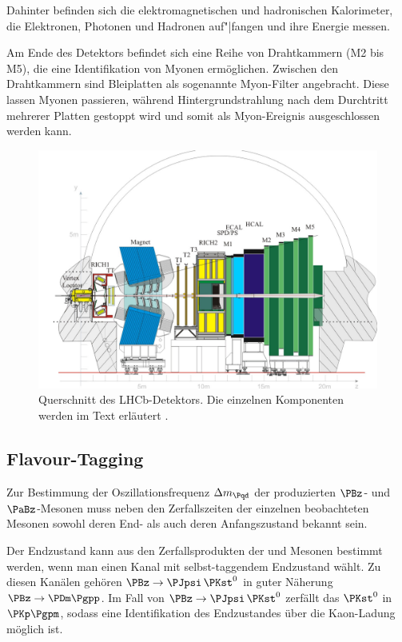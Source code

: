 Dahinter befinden sich die elektromagnetischen und hadronischen Kalorimeter, die Elektronen, Photonen und Hadronen auf"|fangen und ihre Energie messen.

Am Ende des Detektors befindet sich eine Reihe von Drahtkammern (M2 bis M5), die eine Identifikation von Myonen ermöglichen.
Zwischen den Drahtkammern sind Bleiplatten als sogenannte Myon-Filter angebracht.
Diese lassen Myonen passieren, während Hintergrundstrahlung nach dem Durchtritt mehrerer Platten gestoppt wird und somit als Myon-Ereignis ausgeschlossen werden kann.

\begin{figure}
  \includegraphics[width=\textwidth]{figures/lhcb.pdf}
  \caption{Querschnitt des LHCb-Detektors. Die einzelnen Komponenten werden im Text erläutert \cite{lhcb}.}
  \label{lhcb}
\end{figure}

\subsection{Flavour-Tagging}

Zur Bestimmung der Oszillations\-frequenz $\difference{m_{\Pqd}}$ der produzierten $\PBz$- und $\PaBz$-Mesonen muss neben den Zerfallszeiten der einzelnen beobachteten Mesonen sowohl deren End- als auch deren Anfangszustand bekannt sein.

Der Endzustand kann aus den Zerfallsprodukten der \PBz und \PaBz Mesonen bestimmt werden, wenn man einen Kanal mit selbst-taggendem Endzustand wählt.
Zu diesen Kanälen gehören $\PBz \to \PJpsi\,\PKst^0$ in guter Näherung $\PBz \to \PDm \Pgpp$.
Im Fall von $\PBz\to\PJpsi\,\PKst^0$ zerfällt das $\PKst^0$ in $\PKp\Pgpm$, sodass eine Identifikation des Endzustandes über die Kaon-Ladung möglich ist.

